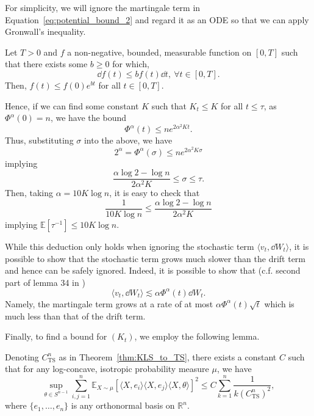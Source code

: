For simplicity, we will ignore the martingale term in Equation~\eqref{eq:potential_bound_2} and regard it as an ODE 
so that we can apply Gronwall's inequality.
\begin{lemma}
  Let \(T > 0\) and \(f\) a non-negative, bounded, measurable function on \([0, T]\) such that there exists some 
  \(b \ge 0\) for which,
  \[\dd f(t) \le b f(t) \dd t, \ \forall t \in [0, T].\]
  Then, \(f(t) \le f(0)e^{bt}\) for all \(t \in [0, T]\).
\end{lemma}
Hence, if we can find some constant \(K\) such that \(K_t \le K\) for all \(t \le \tau\), as \(\Phi^\alpha(0) = n\), 
we have the bound
\[\Phi^\alpha(t) \le n e^{2\alpha^2 K t}.\]
Thus, substituting \(\sigma\) into the above, we have 
\[2^\alpha = \Phi^\alpha(\sigma) \le ne^{2\alpha^2 K\sigma}\]
implying 
\[\frac{\alpha \log 2 - \log n}{2\alpha^2 K} \le \sigma \le \tau.\]
Then, taking \(\alpha = 10K\log n\), it is easy to check that 
\[\frac{1}{10K \log n} \le \frac{\alpha \log 2 - \log n}{2\alpha^2 K}\]
implying \(\mathbb{E}[\tau^{-1}] \le 10K \log n\). 

While this deduction only holds when ignoring the stochastic term \(\langle v_t, \dd W_t\rangle\), it is possible to 
show that the stochastic term grows much slower than the drift term and hence can be safely ignored. 
Indeed, it is possible to show that (c.f. second part of lemma 34 in \cite{Lee_2018})
\[\langle v_t, \dd W_t\rangle \lesssim \alpha \Phi^\alpha(t) \dd W_t.\]
Namely, the martingale term grows at a rate of at most \(\alpha \Phi^\alpha(t)\sqrt{t}\) which is much less 
than that of the drift term.

Finally, to find a bound for \((K_t)\), we employ the following lemma.

\begin{lemma}\label{lem:final_bd}
  Denoting \(C_{\text{TS}}^n\) as in Theorem~\ref{thm:KLS_to_TS}, there exists a constant \(C\) such that 
  for any log-concave, isotropic probability measure \(\mu\), we have
  \[\sup_{\theta \in S^{n - 1}}\sum_{i, j = 1}^n 
    \mathbb{E}_{X \sim \mu}[\langle X, e_i\rangle \langle X, e_j\rangle \langle X, \theta\rangle]^2 \le 
    C \sum_{k = 1}^n \frac{1}{k(C_{\text{TS}}^n)^2},\]
  where \(\{e_1, \ldots, e_n\}\) is any orthonormal basis on \(\mathbb{R}^n\).
\end{lemma}

